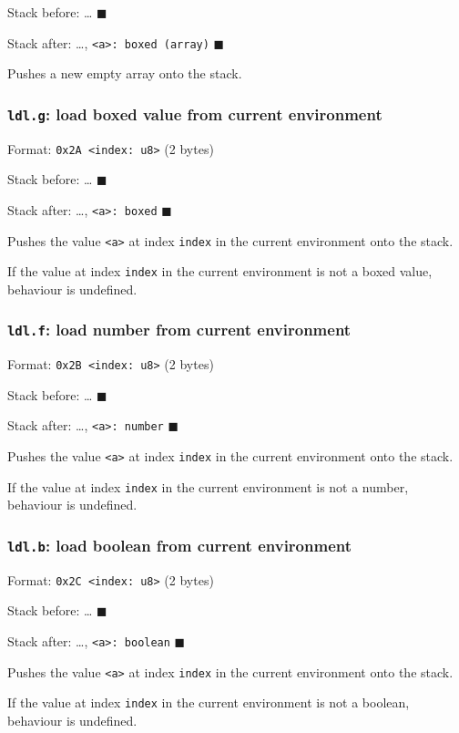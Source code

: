 Stack before: \ldots{} \(\blacksquare\)

Stack after: \ldots{}, \texttt{<a>: boxed (array)} \(\blacksquare\)

Pushes a new empty array onto the stack.

\subsubsection{\texttt{ldl.g}: load boxed value from current environment}
\label{sec:orgbae78d9}
Format: \texttt{0x2A <index: u8>} (2 bytes)

Stack before: \ldots{} \(\blacksquare\)

Stack after: \ldots{}, \texttt{<a>: boxed} \(\blacksquare\)

Pushes the value \texttt{<a>} at index \texttt{index} in the current environment onto
the stack.

If the value at index \texttt{index} in the current environment is not a boxed
value, behaviour is undefined.

\subsubsection{\texttt{ldl.f}: load number from current environment}
\label{sec:orgb7a98c2}
Format: \texttt{0x2B <index: u8>} (2 bytes)

Stack before: \ldots{} \(\blacksquare\)

Stack after: \ldots{}, \texttt{<a>: number} \(\blacksquare\)

Pushes the value \texttt{<a>} at index \texttt{index} in the current environment onto
the stack.

If the value at index \texttt{index} in the current environment is not a
number, behaviour is undefined.

\subsubsection{\texttt{ldl.b}: load boolean from current environment}
\label{sec:org671ebc7}
Format: \texttt{0x2C <index: u8>} (2 bytes)

Stack before: \ldots{} \(\blacksquare\)

Stack after: \ldots{}, \texttt{<a>: boolean} \(\blacksquare\)

Pushes the value \texttt{<a>} at index \texttt{index} in the current environment onto
the stack.

If the value at index \texttt{index} in the current environment is not a
boolean, behaviour is undefined.

